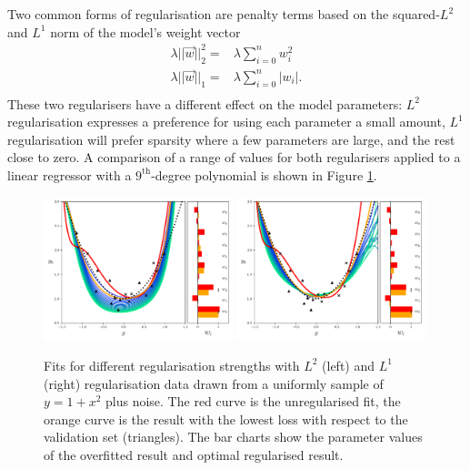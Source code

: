 Two common forms of regularisation are penalty terms based on the squared-$L^{2}$ and $L^{1}$ norm of the model's weight vector
\begin{equation}
    \begin{split}
        \lambda||\vec{w}||^{2}_{2} =& \lambda\sum_{i=0}^{n}w_{i}^{2} \\
        \lambda||\vec{w}||_{1} =& \lambda\sum_{i=0}^{n}|w_{i}|. \\
    \end{split}
\end{equation}
These two regularisers have a different effect on the model parameters: $L^{2}$ regularisation expresses a preference for using each parameter a small amount, $L^{1}$ regularisation will prefer sparsity where a few parameters are large, and the rest close to zero. 
A comparison of a range of values for both regularisers applied to a linear regressor with a $9^{\mathrm{th}}$-degree polynomial is shown in Figure \ref{fig:machine_learning:reg_example}. 
\begin{figure}[h!]
    \begin{center}
        \includegraphics[width=0.49\textwidth]{figures/machine_learning/L2_reg_plot.pdf}
        \includegraphics[width=0.49\textwidth]{figures/machine_learning/L1_reg_plot.pdf}
    \end{center}
    \caption{Fits for different regularisation strengths with $L^{2}$ (left) and $L^{1}$ (right) regularisation data drawn from a uniformly sample of $y=1+x^{2}$ plus noise. The red curve is the unregularised fit, the orange curve is the result with the lowest loss with respect to the validation set (triangles). The bar charts show the parameter values of the overfitted result and optimal regularised result.} 
        \label{fig:machine_learning:reg_example}
\end{figure}
